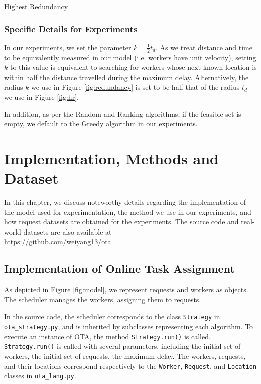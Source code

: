 \documentclass[urop]{socreport}
\begin{document}
\begin{algorithm}[H]
\SetAlgoLined
{}
 \caption{Highest Redundancy}
\end{algorithm}

\subsection{Specific Details for Experiments}
In our experiments, we set the parameter $k = \frac{1}{2} t_d$. As we treat distance and time to be equivalently measured in our model (i.e. workers have unit velocity), setting $k$ to this value is equivalent to searching for workers whose next known location is within half the distance travelled during the maximum delay. Alternatively, the radius $k$ we use in Figure \ref{fig:redundancy} is set to be half that of the radius $t_d$ we use in Figure \ref{fig:hr}.

In addition, as per the Random and Ranking algorithms, if the feasible set is empty, we default to the Greedy algorithm in our experiments.


\chapter{Implementation, Methods and Dataset}
\label{ch:imp}
In this chapter, we discuss noteworthy details regarding the implementation of the model used for experimentation, the method we use in our experiments, and how request datasets are obtained for the experiments. The source code and real-world datasets are also available at \\ 
\url{https://github.com/weiyang13/ota}

\section{Implementation of Online Task Assignment}

As depicted in Figure \ref{fig:model}, we represent requests and workers as objects. The scheduler manages the workers, assigning them to requests. 

In the source code, the scheduler corresponds to the class \verb|Strategy| in \verb|ota_strategy.py|, and is inherited by subclasses representing each algorithm. To execute an instance of OTA, the method \verb|Strategy.run()| is called. \verb|Strategy.run()| is called with several parameters, including the initial set of workers, the initial set of requests, the maximum delay. The workers, requests, and their locations correspond respectively to the \verb|Worker|, \verb|Request|, and \verb|Location| classes in \verb|ota_lang.py|.
\end{document}
